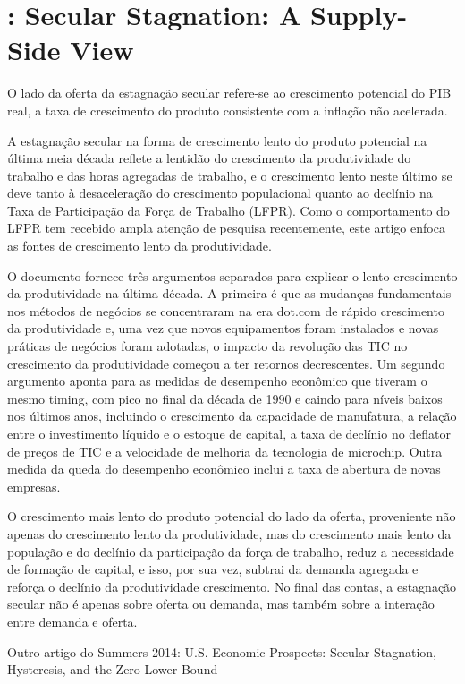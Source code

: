 \section{\citet{Gordon:2015}: Secular Stagnation: A Supply-Side View}
O lado da oferta da estagnação secular refere-se ao crescimento potencial do PIB real, a taxa de crescimento do produto consistente com a inflação não acelerada.

A estagnação secular na forma de crescimento lento do produto potencial na última meia década reflete a lentidão do crescimento da produtividade do trabalho e das horas agregadas de trabalho, e o crescimento lento neste último se deve tanto à desaceleração do crescimento populacional quanto ao declínio na Taxa de Participação da Força de Trabalho (LFPR). Como o comportamento do LFPR tem recebido ampla atenção de pesquisa recentemente, este artigo enfoca as fontes de crescimento lento da produtividade.

O documento fornece três argumentos separados para explicar o lento crescimento da produtividade na última década. A primeira é que as mudanças fundamentais nos métodos de negócios se concentraram na era dot.com de rápido crescimento da produtividade e, uma vez que novos equipamentos foram instalados e novas práticas de negócios foram adotadas, o impacto da revolução das TIC no crescimento da produtividade começou a ter retornos decrescentes. Um segundo argumento aponta para as medidas de desempenho econômico que tiveram o mesmo timing, com pico no final da década de 1990 e caindo para níveis baixos nos últimos anos, incluindo o crescimento da capacidade de manufatura, a relação entre o investimento líquido e o estoque de capital, a taxa de declínio no deflator de preços de TIC e a velocidade de melhoria da tecnologia de microchip. Outra medida da queda do desempenho econômico inclui a taxa de abertura de novas empresas.

O crescimento mais lento do produto potencial do lado da oferta, proveniente não apenas do crescimento lento da produtividade, mas do crescimento mais lento da população e do declínio da participação da força de trabalho, reduz a necessidade de formação de capital, e isso, por sua vez, subtrai da demanda agregada e reforça o declínio da produtividade crescimento. No final das contas, a estagnação secular não é apenas sobre oferta ou demanda, mas também sobre a interação entre demanda e oferta.

Outro artigo do Summers 2014:  U.S. Economic Prospects: Secular Stagnation, Hysteresis, and the Zero Lower Bound

